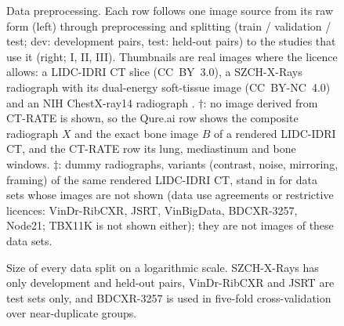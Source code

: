 \begin{figure}[!t]
\centering
{}
\caption{Data preprocessing. Each row follows one image source from its raw form (left) through preprocessing and splitting (train /
validation / test; dev: development pairs, test: held-out pairs) to the studies that use it (right; I, II, III). Thumbnails are real images
where the licence allows: a LIDC-IDRI CT slice \cite{armato2015lidctcia} (CC~BY~3.0), a SZCH-X-Rays radiograph with its dual-energy
soft-tissue image \cite{sun2026bsldm} (CC~BY-NC~4.0) and an NIH ChestX-ray14 radiograph \cite{wang2017chestxray}. $\dagger$: no image
derived from CT-RATE is shown, so the Qure.ai row shows the composite radiograph $X$ and the exact bone image $B$ of a rendered LIDC-IDRI
CT, and the CT-RATE row its lung, mediastinum and bone windows. $\ddagger$: dummy radiographs, variants (contrast, noise, mirroring,
framing) of the same rendered LIDC-IDRI CT, stand in for data sets whose images are not shown (data use agreements or restrictive
licences: VinDr-RibCXR, JSRT, VinBigData, BDCXR-3257, Node21; TBX11K is not shown either); they are not images of these data sets.}
\label{fig:data_pipeline}
\end{figure}

\begin{figure}[!t]
\centering
{}
\caption{Size of every data split on a logarithmic scale. SZCH-X-Rays has only development and held-out pairs, VinDr-RibCXR and JSRT are
test sets only, and BDCXR-3257 is used in five-fold cross-validation over near-duplicate groups.}
\label{fig:data_splits}
\end{figure}


